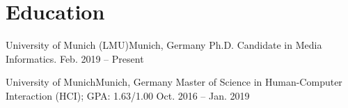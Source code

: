 \section{\textbf{Education}}
  \resumeSubHeadingListStartNoLabel

  \resumeSubheading
    {University of Munich (LMU)}{Munich, Germany}
    {Ph.D. Candidate in Media Informatics.
    }{Feb. 2019 -- Present}


  \resumeSubheading
    {University of Munich}{Munich, Germany}
    {Master of Science in Human-Computer Interaction (HCI); GPA: 1.63/1.00
  }{Oct. 2016 -- Jan. 2019}
  \resumeItemListStart
  \resumeItemListEnd

